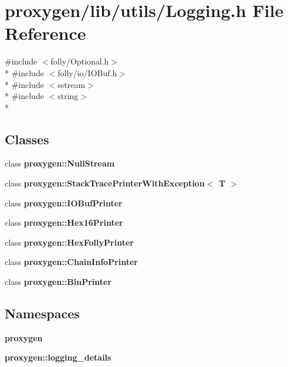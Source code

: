 \section{proxygen/lib/utils/\+Logging.h File Reference}
\label{utils_2Logging_8h}
{\ttfamily \#include $<$folly/\+Optional.\+h$>$}\\*
{\ttfamily \#include $<$folly/io/\+I\+O\+Buf.\+h$>$}\\*
{\ttfamily \#include $<$sstream$>$}\\*
{\ttfamily \#include $<$string$>$}\\*
\subsection*{Classes}
\begin{DoxyCompactItemize}
\item 
class {\bf proxygen\+::\+Null\+Stream}
\item 
class {\bf proxygen\+::\+Stack\+Trace\+Printer\+With\+Exception$<$ T $>$}
\item 
class {\bf proxygen\+::\+I\+O\+Buf\+Printer}
\item 
class {\bf proxygen\+::\+Hex16\+Printer}
\item 
class {\bf proxygen\+::\+Hex\+Folly\+Printer}
\item 
class {\bf proxygen\+::\+Chain\+Info\+Printer}
\item 
class {\bf proxygen\+::\+Bin\+Printer}
\end{DoxyCompactItemize}
\subsection*{Namespaces}
\begin{DoxyCompactItemize}
\item 
 {\bf proxygen}
\item 
 {\bf proxygen\+::logging\+\_\+details}
\end{DoxyCompactItemize}
